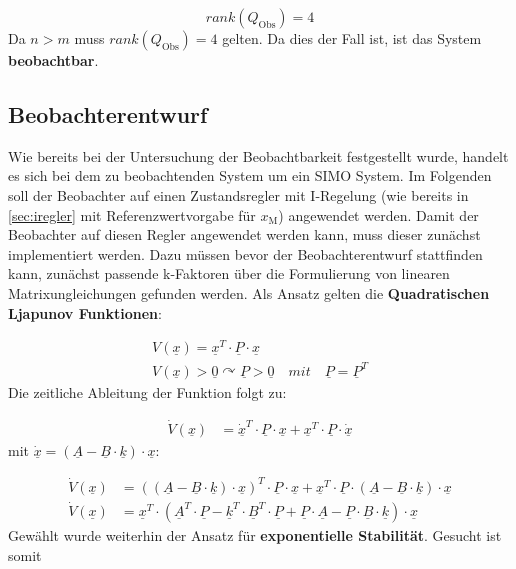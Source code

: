 \begin{equation}
    \boxed{rank(Q_{\mathrm{Obs}}) = 4}
\end{equation}
\newline
Da $n > m$ muss $rank(Q_{\mathrm{Obs}}) = 4$ gelten. Da dies der Fall ist, ist das System \textbf{beobachtbar}.

\subsection{Beobachterentwurf}

Wie bereits bei der Untersuchung der Beobachtbarkeit festgestellt wurde, handelt es sich bei dem zu beobachtenden System um ein SIMO System. Im Folgenden soll der Beobachter auf einen Zustandsregler mit I-Regelung (wie bereits in \autoref{sec:iregler} mit Referenzwertvorgabe für $x_{\mathrm{M}}$) angewendet werden. Damit der Beobachter auf diesen Regler angewendet werden kann, muss dieser zunächst implementiert werden. Dazu müssen bevor der Beobachterentwurf stattfinden kann, zunächst passende k-Faktoren über die Formulierung von linearen Matrixungleichungen gefunden werden. Als Ansatz gelten die \textbf{Quadratischen Ljapunov Funktionen}:

\begin{align}
    V(\underline{x}) = \underline{x}^T \cdot \underline{P} \cdot \underline{x} \\
    V(\underline{x}) > \underline{0} \curvearrowright   \underline{P} > \underline{0} \quad mit \quad 
    \underline{P} = \underline{P}^T \nonumber
\end{align}
\newline
Die zeitliche Ableitung der Funktion folgt zu:

\begin{align}
    \dot{V}(\underline{x}) &= \dot{\underline{x}}^T \cdot \underline{P} \cdot \underline{x} + \underline{x}^T \cdot \underline{P} \cdot \dot{\underline{x}}
\end{align}
\newline
mit $\dot{\underline{x}} = (\underline{A}-\underline{B}\cdot\underline{k})\cdot\underline{x}$:

\begin{align}
    \dot{V}(\underline{x}) &= ((\underline{A}-\underline{B}\cdot\underline{k})\cdot\underline{x})^T \cdot \underline{P} \cdot \underline{x} + \underline{x}^T \cdot \underline{P} \cdot (\underline{A}-\underline{B}\cdot\underline{k})\cdot\underline{x} \nonumber \\
    \dot{V}(\underline{x}) &= \underline{x}^T\cdot(\underline{A}^T\cdot\underline{P}-\underline{k}^T\cdot\underline{B}^T\cdot\underline{P}+\underline{P}\cdot\underline{A}-\underline{P}\cdot\underline{B}\cdot\underline{k})\cdot\underline{x}
\end{align}
\newline
Gewählt wurde weiterhin der Ansatz für \textbf{exponentielle Stabilität}. Gesucht ist somit

